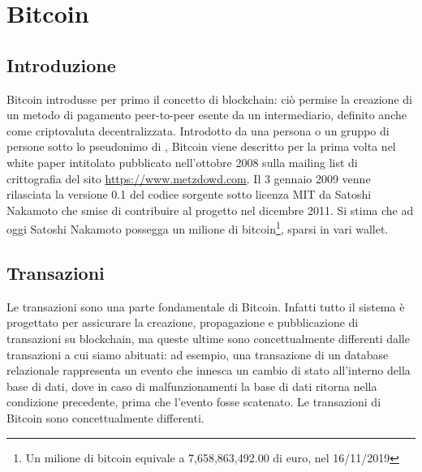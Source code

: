 \chapter{Bitcoin}
\label{chap:bitcoin}

\section{Introduzione}
\label{sec:introduzione}

Bitcoin introdusse per primo il concetto di blockchain: ciò permise la creazione di un metodo di pagamento peer-to-peer esente da un intermediario, definito anche come criptovaluta decentralizzata.
Introdotto da una persona o un gruppo di persone sotto lo pseudonimo di , Bitcoin viene descritto per la prima volta nel white paper intitolato  pubblicato nell’ottobre 2008 sulla mailing list di crittografia del sito \url{https://www.metzdowd.com}.\newline
Il 3 gennaio 2009 venne rilasciata la versione 0.1 del codice sorgente sotto licenza MIT da Satoshi Nakamoto che smise di contribuire al progetto nel dicembre 2011. Si stima che ad oggi Satoshi Nakamoto possegga un milione di bitcoin\footnote{Un milione di bitcoin equivale a 7,658,863,492.00 di euro, nel 16/11/2019}, sparsi in vari wallet.

\section{Transazioni}
\label{sec:transazioniBitcoin}

Le transazioni sono una parte fondamentale di Bitcoin. Infatti tutto il sistema è progettato per assicurare la creazione, propagazione e pubblicazione di transazioni su blockchain, ma queste ultime sono concettualmente differenti dalle transazioni a cui siamo abituati: ad esempio, una transazione di un database relazionale rappresenta un evento che innesca un cambio di stato all’interno della base di dati, dove in caso di malfunzionamenti la base di dati ritorna nella condizione precedente, prima che l’evento fosse scatenato.
Le transazioni di Bitcoin sono concettualmente differenti.


